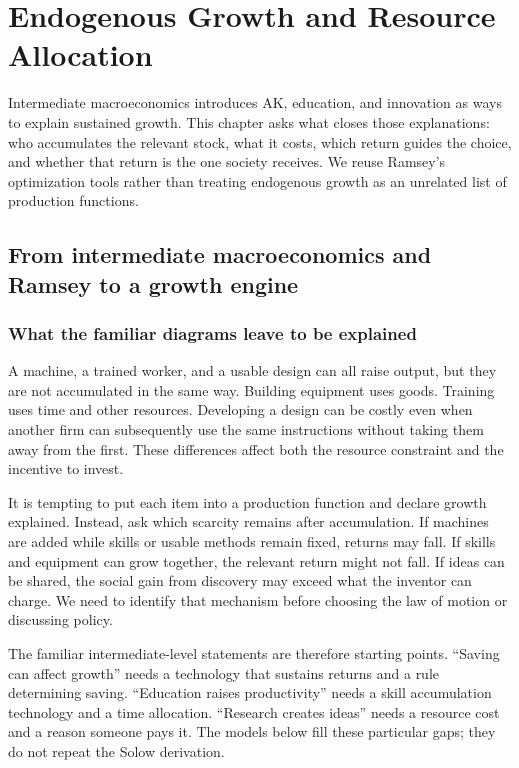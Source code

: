 \section{Endogenous Growth and Resource Allocation}\label{sec:endogenous-growth}

Intermediate macroeconomics introduces AK, education, and innovation as ways
to explain sustained growth. This chapter asks what closes those explanations:
who accumulates the relevant stock, what it costs, which return guides the
choice, and whether that return is the one society receives. We reuse Ramsey's
optimization tools rather than treating endogenous growth as an unrelated list
of production functions.

\subsection{From intermediate macroeconomics and Ramsey to a growth engine}

\subsubsection{What the familiar diagrams leave to be explained}

A machine, a trained worker, and a usable design can all raise output, but they
are not accumulated in the same way. Building equipment uses goods. Training
uses time and other resources. Developing a design can be costly even when
another firm can subsequently use the same instructions without taking them
away from the first. These differences affect both the resource constraint
and the incentive to invest.

It is tempting to put each item into a production function and declare growth
explained. Instead, ask which scarcity remains after accumulation. If machines
are added while skills or usable methods remain fixed, returns may fall. If
skills and equipment can grow together, the relevant return might not fall.
If ideas can be shared, the social gain from discovery may exceed what the
inventor can charge. We need to identify that mechanism before choosing the
law of motion or discussing policy.

The familiar intermediate-level statements are therefore starting points.
``Saving can affect growth'' needs a technology that sustains returns and a
rule determining saving. ``Education raises productivity'' needs a skill
accumulation technology and a time allocation. ``Research creates ideas''
needs a resource cost and a reason someone pays it. The models below fill
these particular gaps; they do not repeat the Solow derivation.

